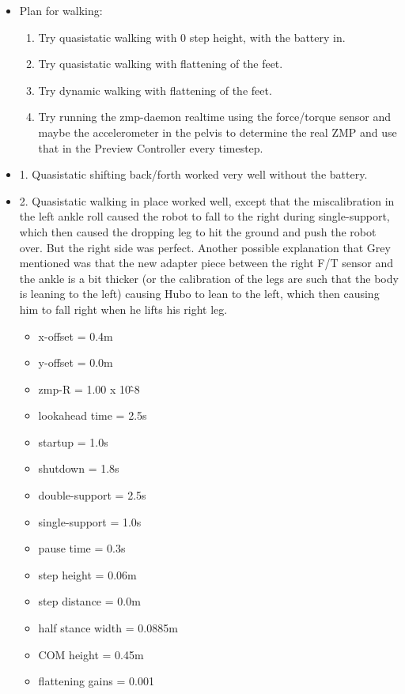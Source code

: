 \documentclass[letterpaper, 10 pt]{report}
\begin{document}
\begin{itemize}
\item Plan for walking:
\begin{enumerate}
\item Try quasistatic walking with 0 step height, with the battery in.
\item Try quasistatic walking with flattening of the feet.
\item Try dynamic walking with flattening of the feet.
\item Try running the zmp-daemon realtime using the force/torque sensor and maybe the accelerometer in the pelvis to determine the real ZMP and use that in the Preview Controller every timestep.
\end{enumerate}
\item 1. Quasistatic shifting back/forth worked very well without the battery.
\item 2. Quasistatic walking in place worked well, except that the miscalibration in the left ankle roll caused the robot to fall to the right during single-support, which then caused the dropping leg to hit the ground and push the robot over. But the right side was perfect. Another possible explanation that Grey mentioned was that the new adapter piece between the right F/T sensor and the ankle is a bit thicker (or the calibration of the legs are such that the body is leaning to the left) causing Hubo to lean to the left, which then causing him to fall right when he lifts his right leg.
\begin{itemize}
\item x-offset = 0.4m
\item y-offset = 0.0m
\item zmp-R = 1.00 x 10\^-8
\item lookahead time = 2.5s
\item startup = 1.0s
\item shutdown = 1.8s
\item double-support = 2.5s
\item single-support = 1.0s
\item pause time = 0.3s
\item step height = 0.06m
\item step distance = 0.0m
\item half stance width = 0.0885m
\item COM height = 0.45m
\item flattening gains = 0.001


\end{itemize}
\end{itemize}
\end{document}
